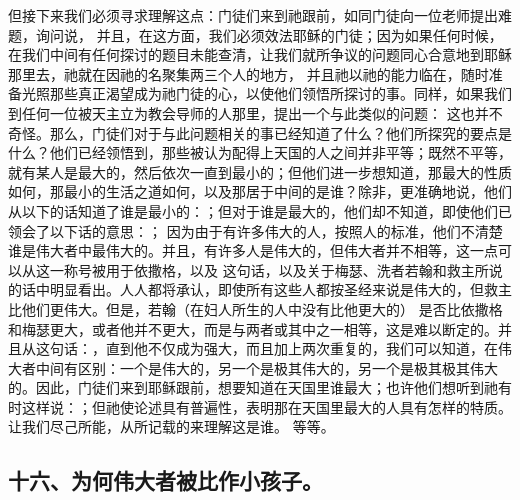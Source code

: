 但接下来我们必须寻求理解这点：门徒们来到祂跟前，如同门徒向一位老师提出难题，询问说， 并且，在这方面，我们必须效法耶稣的门徒；因为如果任何时候，在我们中间有任何探讨的题目未能查清，让我们就所争议的问题同心合意地到耶稣那里去，祂就在因祂的名聚集两三个人的地方， 并且祂以祂的能力临在，随时准备光照那些真正渴望成为祂门徒的心，以使他们领悟所探讨的事。同样，如果我们到任何一位被天主立为教会导师的人那里，提出一个与此类似的问题： 这也并不奇怪。那么，门徒们对于与此问题相关的事已经知道了什么？他们所探究的要点是什么？他们已经领悟到，那些被认为配得上天国的人之间并非平等；既然不平等，就有某人是最大的，然后依次一直到最小的；但他们进一步想知道，那最大的性质如何，那最小的生活之道如何，以及那居于中间的是谁？除非，更准确地说，他们从以下的话知道了谁是最小的：；但对于谁是最大的，他们却不知道，即使他们已领会了以下话的意思：； 因为由于有许多伟大的人，按照人的标准，他们不清楚谁是伟大者中最伟大的。并且，有许多人是伟大的，但伟大者并不相等，这一点可以从这一称号被用于依撒格，以及 这句话，以及关于梅瑟、洗者若翰和救主所说的话中明显看出。人人都将承认，即使所有这些人都按圣经来说是伟大的，但救主比他们更伟大。但是，若翰（在妇人所生的人中没有比他更大的） 是否比依撒格和梅瑟更大，或者他并不更大，而是与两者或其中之一相等，这是难以断定的。并且从这句话：，直到他不仅成为强大，而且加上两次重复的，我们可以知道，在伟大者中间有区别：一个是伟大的，另一个是极其伟大的，另一个是极其极其伟大的。因此，门徒们来到耶稣跟前，想要知道在天国里谁最大；也许他们想听到祂有时这样说：；但祂使论述具有普遍性，表明那在天国里最大的人具有怎样的特质。让我们尽己所能，从所记载的来理解这是谁。 等等。\par


\subsection{十六、为何伟大者被比作小孩子。}

